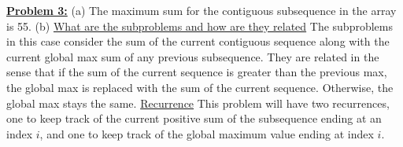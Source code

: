 \documentclass[11pt]{article}
\begin{document}
\begin{flushleft}
		\newline\newline
	    \textbf{\underline{Problem 3:}} 
	    \newline
	    (a) The maximum sum for the contiguous subsequence in the array is 55. 
	    \newline
	    (b) \underline{What are the subproblems and how are they related} \newline
	    The subproblems in this case consider the sum of the current contiguous sequence along with the current global max sum of any previous subsequence. They are related in the sense that if the sum of the current sequence is greater than the previous max, the global max is replaced with the sum of the current sequence. Otherwise, the global max stays the same. 
	    \newpage
	    \underline{Recurrence} \newline
	    This problem will have two recurrences, one to keep track of the current positive sum of the subsequence ending at an index $i$, and one to keep track of the global maximum value ending at index $i$. 
	\end{flushleft}
\end{document}
